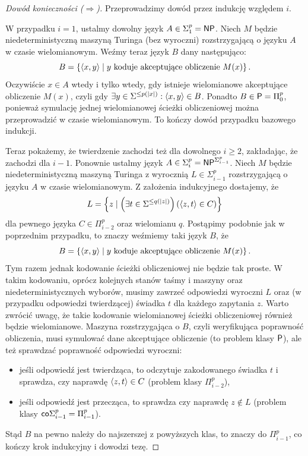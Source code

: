 \begin{proof}[Dowód konieczności ($\Rightarrow$)]
    Przeprowadzimy dowód przez indukcję względem $i$.

    W przypadku $i = 1$, ustalmy dowolny język $A \in \Sigma_1^p = \textsf{NP}$.
    Niech $M$ będzie niedeterministyczną maszyną Turinga (bez wyroczni) rozstrzygającą o języku $A$ w czasie wielomianowym. 
    Weźmy teraz język $B$ dany następująco:
    \[ B = \left\{\left\langle x, y \right\rangle \mid \text{$y$ koduje akceptujące obliczenie $M(x)$} \right\}. \]
    Oczywiście $x \in A$ wtedy i tylko wtedy, gdy istnieje wielomianowe akceptujące obliczenie $M(x)$, czyli gdy $\exists y \in \Sigma^{\leq p(|x|)} : \left\langle x, y \right\rangle \in B$.
    Ponadto $B \in \textsf{P} = \Pi_0^p$, ponieważ symulację jednej wielomianowej ścieżki obliczeniowej można przeprowadzić w czasie wielomianowym.
    To kończy dowód przypadku bazowego indukcji.

    Teraz pokażemy, że twierdzenie zachodzi też dla dowolnego $i \geq 2$, zakładając, że zachodzi dla $i-1$.
    Ponownie ustalmy język $A \in \Sigma_i^p = \textsf{NP}^{\Sigma_{i-1}^p}$.
    Niech $M$ będzie niedeterministyczną maszyną Turinga z wyrocznią $L \in \Sigma_{i-1}^p$ rozstrzygającą o języku $A$ w czasie wielomianowym.
    Z założenia indukcyjnego dostajemy, że
    \[ L = \left\{z \mid \left(\exists t \in \Sigma^{\leq q(|z|)}\right) \left(\left\langle z, t \right\rangle \in C\right) \right\} \]
    dla pewnego języka $C \in \Pi_{i-2}^p$ oraz wielomianu $q$.
    Postąpimy podobnie jak w poprzednim przypadku, to znaczy weźmiemy taki język $B$, że
    \[ B = \left\{\left\langle x, y \right\rangle \mid \text{$y$ koduje akceptujące obliczenie $M(x)$} \right\}. \]
    Tym razem jednak kodowanie ścieżki obliczeniowej nie będzie tak proste.
    W takim kodowaniu, oprócz kolejnych stanów taśmy i maszyny oraz niedeterministycznych wyborów, musimy zawrzeć odpowiedzi wyroczni $L$ oraz (w przypadku odpowiedzi twierdzącej) świadka $t$ dla każdego zapytania $z$.
    Warto zwrócić uwagę, że takie kodowanie wielomianowej ścieżki obliczeniowej również będzie wielomianowe.
    Maszyna rozstrzygająca o $B$, czyli weryfikująca poprawność obliczenia, musi symulować dane akceptujące obliczenie (to problem klasy $\textsf{P}$), ale też sprawdzać poprawność odpowiedzi wyroczni:
    \begin{itemize}[nosep]
        \item jeśli odpowiedź jest twierdząca, to odczytuje zakodowanego świadka $t$ i sprawdza, czy naprawdę $\left\langle z, t \right\rangle \in C$ (problem klasy $\Pi_{i-2}^p$),
        \item jeśli odpowiedź jest przecząca, to sprawdza czy naprawdę $z \notin L$ (problem klasy $\textsf{co} \Sigma_{i-1}^p = \Pi_{i-1}^p$).
    \end{itemize}
    Stąd $B$ na pewno należy do najszerszej z powyższych klas, to znaczy do $\Pi_{i-1}^p$, co kończy krok indukcyjny i dowodzi tezę.
\end{proof}

